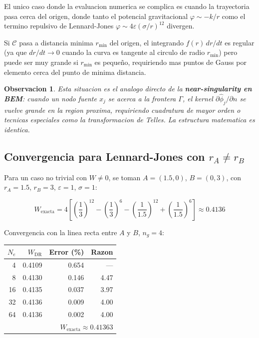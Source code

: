 \documentclass[12pt,a4paper]{article}
\newtheorem{remark}{Observacion}
\begin{document}
El unico caso donde la evaluacion numerica se complica es cuando la
trayectoria pasa cerca del origen, donde tanto el potencial gravitacional
$\varphi \sim -k/r$ como el termino repulsivo de Lennard-Jones
$\varphi \sim 4\varepsilon(\sigma/r)^{12}$ divergen.

Si $\mathcal{C}$ pasa a distancia minima $r_{\min}$ del origen, el
integrando $f(r)\,dr/dt$ es regular (ya que $dr/dt \to 0$ cuando la
curva es tangente al circulo de radio $r_{\min}$) pero puede ser muy
grande si $r_{\min}$ es pequeño, requiriendo mas puntos de Gauss por
elemento cerca del punto de minima distancia.

\begin{remark}
Esta situacion es el analogo directo de la \textbf{near-singularity
en BEM}: cuando un nodo fuente $x_j$ se acerca a la frontera $\Gamma$,
el kernel $\partial\hat\phi_j/\partial n$ se vuelve grande en la region
proxima, requiriendo cuadratura de mayor orden o tecnicas especiales
como la transformacion de Telles. La estructura matematica es identica.
\end{remark}

\subsection{Convergencia para Lennard-Jones con $r_A \neq r_B$}

Para un caso no trivial con $W \neq 0$, se toman
$A = (1.5, 0)$, $B = (0, 3)$, con $r_A = 1.5$, $r_B = 3$,
$\varepsilon = 1$, $\sigma = 1$:

\begin{equation}
    W_{\text{exacta}} = 4\left[
        \left(\frac{1}{3}\right)^{12} - \left(\frac{1}{3}\right)^{6}
      - \left(\frac{1}{1.5}\right)^{12} + \left(\frac{1}{1.5}\right)^{6}
    \right]
    \approx 0.4136
\end{equation}

Convergencia con la linea recta entre $A$ y $B$, $n_g = 4$:

\begin{center}
\begin{tabular}{rrrr}
\toprule
$N_e$ & $W_{\text{DR}}$ & Error (\%) & Razon \\
\midrule
  4 & 0.4109 & 0.654 & ---  \\
  8 & 0.4130 & 0.146 & 4.47 \\
 16 & 0.4135 & 0.037 & 3.97 \\
 32 & 0.4136 & 0.009 & 4.00 \\
 64 & 0.4136 & 0.002 & 4.00 \\
\bottomrule
\multicolumn{4}{r}{$W_{\text{exacta}} \approx 0.41363$}
\end{tabular}
\end{center}
\end{document}
